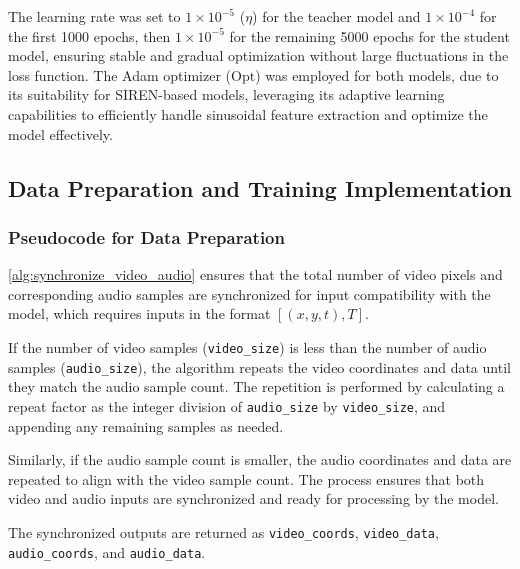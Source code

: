 The learning rate was set to $1 \times 10^{-5}$ ($\eta$) for the teacher model and $1 \times 10^{-4}$ for the first 1000 epochs, then $1 \times 10^{-5}$ for the remaining 5000 epochs for the student model, ensuring stable and gradual optimization without large fluctuations in the loss function. The Adam optimizer ($\text{Opt}$) was employed for both models, due to its suitability for SIREN-based models, leveraging its adaptive learning capabilities to efficiently handle sinusoidal feature extraction and optimize the model effectively.

\pagebreak

\subsection{Data Preparation and Training Implementation}

\subsubsection{Pseudocode for Data Preparation}

\autoref{alg:synchronize_video_audio} ensures that the total number of video pixels and corresponding audio samples are synchronized for input compatibility with the model, which requires inputs in the format \([(x, y, t), T]\). 

If the number of video samples (\texttt{video\_size}) is less than the number of audio samples (\texttt{audio\_size}), the algorithm repeats the video coordinates and data until they match the audio sample count. The repetition is performed by calculating a repeat factor as the integer division of \texttt{audio\_size} by \texttt{video\_size}, and appending any remaining samples as needed. 

Similarly, if the audio sample count is smaller, the audio coordinates and data are repeated to align with the video sample count. The process ensures that both video and audio inputs are synchronized and ready for processing by the model.

The synchronized outputs are returned as \texttt{video\_coords}, \texttt{video\_data}, \texttt{audio\_coords}, and \texttt{audio\_data}.

